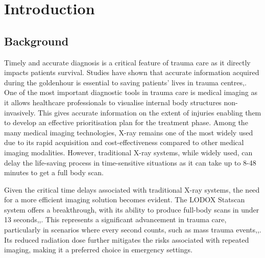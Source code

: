 
\glsresetall %
\chapter[Introduction]{Introduction}\label{ch:Introduction}

\section{Background}
Timely and accurate diagnosis is a critical feature of trauma care as it directly impacts patients survival. Studies have shown that accurate information acquired during the \gls{goldenhour} is essential to saving patients' lives in trauma centres\cite{fu_lodoxstatscan_2008},\cite{fu_lodoxstatscan_2011}. One of the most important diagnostic tools in trauma care is medical imaging as it allows healthcare professionals to visualise internal body structures non-invasively. This gives accurate information on the extent of injuries enabling them to develop an effective prioritisation plan for the treatment phase. Among the many medical imaging technologies, X-ray remains one of the most widely used due to its rapid acquisition and cost-effectiveness compared to other medical imaging modalities\cite{juneja_denoising_2024}. However, traditional X-ray systems, while widely used, can delay the life-saving process in time-sensitive situations as it can take up to 8-48 minutes to get a full body scan\cite{beningfield_report_2003}.

 Given the critical time delays associated with traditional X-ray systems, the need for a more efficient imaging solution becomes evident. The LODOX\textsuperscript{\textregistered} Statscan\textsuperscript{\textregistered} system offers a breakthrough, with its ability to produce full-body scans in under 13 seconds\cite{beningfield_report_2003},\cite{amirlak_novel_2009},\cite{noauthor_full-body_nodate}. This represents a significant advancement in trauma care, particularly in scenarios where every second counts, such as mass trauma events\cite{exadaktylos_total-body_2008},\cite{lodoxsystems_lodox_2018-1},\cite{whiley_full-body_2013}. Its reduced radiation dose further mitigates the risks associated with repeated imaging, making it a preferred choice in emergency settings\cite{exadaktylos_total-body_2008}.



